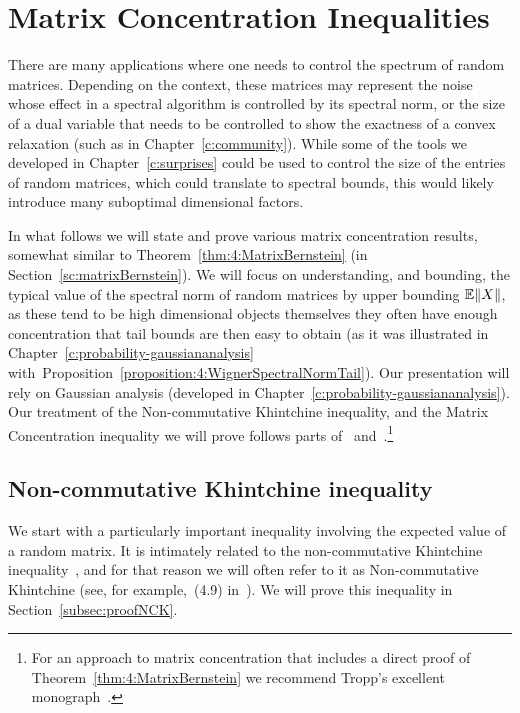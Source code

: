 \chapter{Matrix Concentration Inequalities}
\label{c:probability-matrixconcentration}


There are many applications where one needs to control the spectrum of random matrices. Depending on the context, these matrices may represent the noise whose effect in a spectral algorithm is controlled by its spectral norm, or the size of a dual variable that needs to be controlled to show the exactness of a convex relaxation (such as in Chapter~\ref{c:community}). While some of the tools we developed in Chapter~\ref{c:surprises} could be used to control the size of the entries of random matrices, which could translate to spectral bounds, this would likely introduce many suboptimal dimensional factors. 

In what follows we will state and prove various matrix concentration results, somewhat similar to Theorem~\ref{thm:4:MatrixBernstein} (in Section~\ref{sc:matrixBernstein}). We will focus on understanding, and bounding, the typical value of the spectral norm of random matrices by upper bounding $\mathbb{E}\|X\|$, as these tend to be high dimensional objects themselves they often have enough concentration that tail bounds are then easy to obtain (as it was illustrated in Chapter~\ref{c:probability-gaussiananalysis} with~Proposition~\ref{proposition:4:WignerSpectralNormTail}). Our presentation will rely on Gaussian analysis (developed in Chapter~\ref{c:probability-gaussiananalysis}). Our treatment of the Non-commutative Khintchine inequality, and the Matrix Concentration inequality we will prove follows parts of~\cite{Ramon-StFlour-2022} and~\cite{Tropp_MatrixConcentrationElementary}.\footnote{For an approach to matrix concentration that includes a direct proof of Theorem~\ref{thm:4:MatrixBernstein}  we recommend Tropp's excellent monograph~\cite{Tropp:TailBoundsRM_Monograph}.}




\section{Non-commutative Khintchine inequality}

We start with a particularly important inequality involving the expected value of a random matrix. It is intimately related to the non-commutative Khintchine inequality~\cite{Pis03}, and for that reason we will often refer to it as Non-commutative Khintchine (see, for example,~(4.9) in~\cite{Tropp:TailBoundsRM}). We will prove this inequality in Section~\ref{subsec:proofNCK}.

